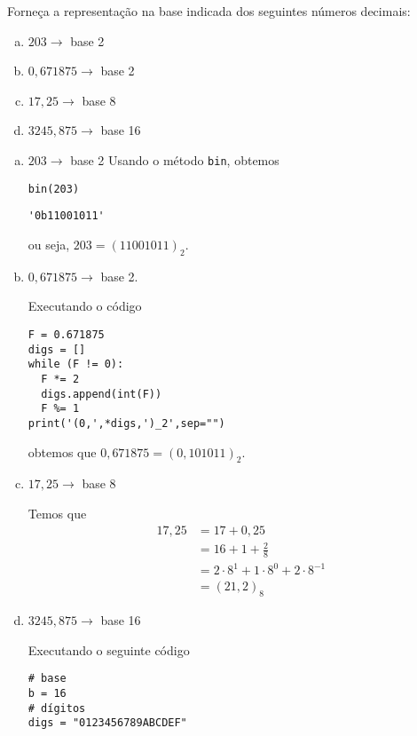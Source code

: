 \begin{exeresol}
  Forneça a representação na base indicada dos seguintes números decimais:
  \begin{enumerate}[a)]
  \item $203 \to$ base 2
  \item $0,671875 \to$ base 2
  \item $17,25 \to$ base 8
  \item $3245,875 \to$ base 16
  \end{enumerate}
\end{exeresol}
\begin{resol}
  \begin{enumerate}[a)]

  \item $203 \to$ base 2
    Usando o método {\python} \texttt{bin}, obtemos

\begin{lstlisting}
bin(203)
\end{lstlisting}

\begin{verbatim}
'0b11001011'
\end{verbatim}
    ou seja, $203 = (11001011)_2$.

  \item $0,671875 \to$ base 2.

    Executando o código

\begin{lstlisting}
F = 0.671875
digs = []
while (F != 0):
  F *= 2
  digs.append(int(F))
  F %= 1
print('(0,',*digs,')_2',sep="")      
\end{lstlisting}

\noindent obtemos que $0,671875 = (0,101011)_2$.

  \item $17,25 \to$ base 8

    Temos que
    \begin{align}
      17,25 &= 17 + 0,25\\
            &= 16 + 1 + \frac{2}{8}\\
            &= 2\cdot 8^1 + 1\cdot 8^0 + 2\cdot 8^{-1}\\
            &= (21,2)_8
    \end{align}

  \item $3245,875 \to$ base 16

    Executando o seguinte código

\begin{lstlisting}
# base
b = 16
# dígitos
digs = "0123456789ABCDEF"


\end{lstlisting}
\end{enumerate}
\end{resol}
